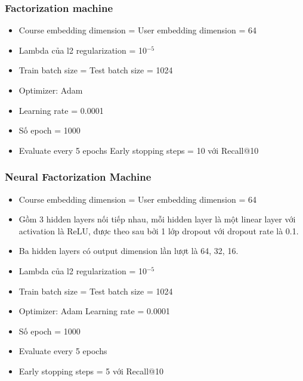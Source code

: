 \subsubsection{Factorization machine}
\begin{itemize}
    \item Course embedding dimension = User embedding dimension = 64
    \item Lambda của l2 regularization = 10$^{-5}$
    \item Train batch size = Test batch size = 1024
    \item Optimizer: Adam
    \item Learning rate = 0.0001
    \item Số epoch = 1000
    \item Evaluate every 5 epochs Early stopping steps = 10 với Recall@10
\end{itemize}
\subsubsection{Neural Factorization Machine}
\begin{itemize}
    \item Course embedding dimension = User embedding dimension = 64
    \item Gồm 3 hidden layers nối tiếp nhau, mỗi hidden layer là một linear layer với activation là ReLU, được theo sau bởi 1 lớp dropout với dropout rate là 0.1.
    \item Ba hidden layers có output dimension lần lượt là 64, 32, 16.
    \item Lambda của l2 regularization = 10$^{-5}$
    \item Train batch size = Test batch size = 1024
    \item Optimizer: Adam Learning rate = 0.0001
    \item Số epoch = 1000
    \item Evaluate every 5 epochs
    \item Early stopping steps = 5 với Recall@10
\end{itemize}
